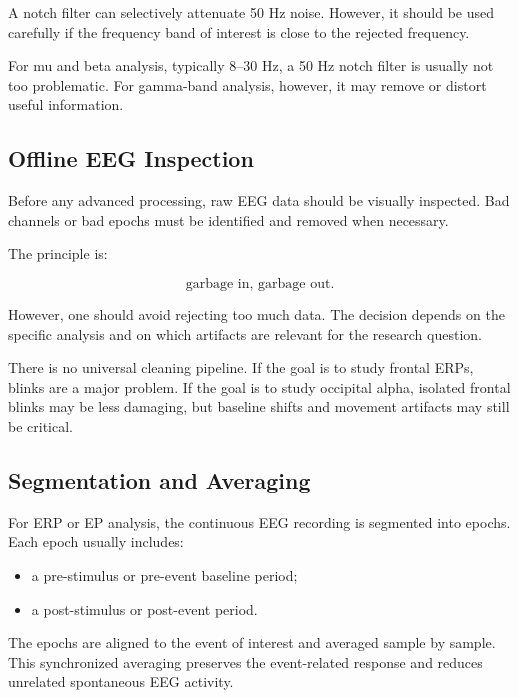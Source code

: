 A notch filter can selectively attenuate 50 Hz noise. However, it should be used carefully if the frequency band of interest is close to the rejected frequency.

\begin{authornote}
For mu and beta analysis, typically 8--30 Hz, a 50 Hz notch filter is usually not too problematic. For gamma-band analysis, however, it may remove or distort useful information.
\end{authornote}

\subsection{Offline EEG Inspection}

Before any advanced processing, raw EEG data should be visually inspected. Bad channels or bad epochs must be identified and removed when necessary.

The principle is:

\[
\text{garbage in, garbage out}.
\]

However, one should avoid rejecting too much data. The decision depends on the specific analysis and on which artifacts are relevant for the research question.

\begin{authornote}
There is no universal cleaning pipeline. If the goal is to study frontal ERPs, blinks are a major problem. If the goal is to study occipital alpha, isolated frontal blinks may be less damaging, but baseline shifts and movement artifacts may still be critical.
\end{authornote}

\subsection{Segmentation and Averaging}

For ERP or EP analysis, the continuous EEG recording is segmented into epochs. Each epoch usually includes:

\begin{itemize}[noitemsep]
    \item a pre-stimulus or pre-event baseline period;
    \item a post-stimulus or post-event period.
\end{itemize}

The epochs are aligned to the event of interest and averaged sample by sample. This synchronized averaging preserves the event-related response and reduces unrelated spontaneous EEG activity.

